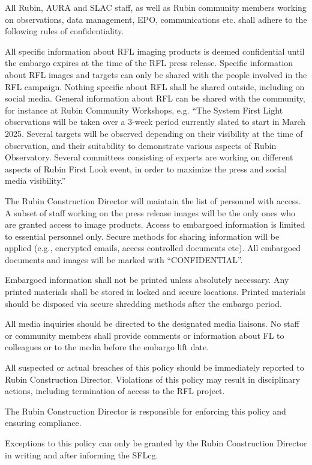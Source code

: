 All Rubin, AURA and SLAC staff, as well as Rubin community members working on observations, data management,
EPO, communications etc. shall adhere to the following rules of confidentiality. 

All specific information about RFL imaging products is deemed confidential until the embargo expires at the time
of the RFL press release. Specific information about RFL images and targets can only be shared with the people
involved in the RFL campaign. Nothing specific about RFL shall be shared outside, including on social media.
General information about RFL can be shared with the community, for instance at Rubin Community Workshops,
e.g. ``The System First Light observations will be taken over a 3-week period currently slated to start in March 2025.
Several targets will be observed depending on their visibility at the time of observation, and their suitability to
demonstrate various aspects of Rubin Observatory. Several committees consisting of experts are working on different
aspects of Rubin First Look event, in order to maximize the press and social media visibility.''

The Rubin Construction Director will maintain the list of personnel with access. A subset of staff working on the
press release images will be the only ones who are granted access to image products. 
Access to embargoed information is limited to essential personnel only. Secure methods for sharing information
will be applied (e.g., encrypted emails, access controlled documents etc). All embargoed documents and images
will be marked with ``CONFIDENTIAL''. 

Embargoed information shall not be printed unless absolutely necessary. Any printed materials shall be stored
in locked and secure locations. Printed materials should be disposed via secure shredding methods after the
embargo period.

All media inquiries should be directed to the designated media liaisons. No staff or community members shall
provide comments or information about FL to colleagues or to the media before the embargo lift date.

All suspected or actual breaches of this policy should be immediately reported to Rubin Construction Director.
Violations of this policy may result in disciplinary actions, including termination of access to the RFL project.

The Rubin Construction Director is responsible for enforcing this policy and ensuring compliance.

Exceptions to this policy can only be granted by the Rubin Construction Director in writing and after informing
the SFLcg. 

  